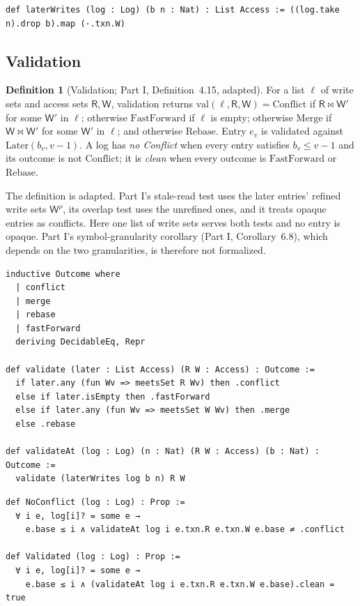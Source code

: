 \documentclass[11pt,letterpaper]{article}
\theoremstyle{definition}
\newtheorem{definition}[theorem]{Definition}
\theoremstyle{remark}
\newcommand{\R}{\mathsf{R}}
\newcommand{\W}{\mathsf{W}}
\newcommand{\meets}{\bowtie}
\newcommand{\Later}{\mathrm{Later}}
\newcommand{\op}[1]{\mathrm{#1}}
\newcommand{\val}{\op{val}}
\newcommand{\FF}{\mathrm{FastForward}}
\newcommand{\Rb}{\mathrm{Rebase}}
\newcommand{\Mg}{\mathrm{Merge}}
\newcommand{\Cf}{\mathrm{Conflict}}
\begin{document}
\begin{lstlisting}[language=Lean,caption={Later write sets (\texttt{YonedaTx/Log.lean})},label={lst:mcbl:later}]
def laterWrites (log : Log) (b n : Nat) : List Access := ((log.take n).drop b).map (·.txn.W)
\end{lstlisting}

\subsection{Validation}

\begin{definition}[Validation; Part I, Definition~4.15, adapted]
\label{def:mcbl:validation}
For a list $\ell$ of write sets and access sets $\R,\W$, validation returns $\val(\ell,\R,\W)=\Cf$ if $\R\meets\W'$ for some $\W'$ in $\ell$; otherwise $\FF$ if $\ell$ is empty; otherwise $\Mg$ if $\W\meets\W'$ for some $\W'$ in $\ell$; and otherwise $\Rb$. Entry $e_v$ is validated against $\Later(b_v,v-1)$. A log has \emph{no Conflict} when every entry satisfies $b_v\leq v-1$ and its outcome is not $\Cf$; it is \emph{clean} when every outcome is $\FF$ or $\Rb$.
\end{definition}

The definition is adapted. Part I's stale-read test uses the later entries' refined write sets $\W^\rho$, its overlap test uses the unrefined ones, and it treats opaque entries as conflicts. Here one list of write sets serves both tests and no entry is opaque. Part I's symbol-granularity corollary (Part I, Corollary~6.8), which depends on the two granularities, is therefore not formalized.

\begin{lstlisting}[language=Lean,caption={Validation outcomes (\texttt{YonedaTx/Validation.lean})},label={lst:mcbl:validate}]
inductive Outcome where
  | conflict
  | merge
  | rebase
  | fastForward
  deriving DecidableEq, Repr

def validate (later : List Access) (R W : Access) : Outcome :=
  if later.any (fun Wv => meetsSet R Wv) then .conflict
  else if later.isEmpty then .fastForward
  else if later.any (fun Wv => meetsSet W Wv) then .merge
  else .rebase

def validateAt (log : Log) (n : Nat) (R W : Access) (b : Nat) : Outcome :=
  validate (laterWrites log b n) R W
\end{lstlisting}

\begin{lstlisting}[language=Lean,caption={Validated logs (\texttt{YonedaTx/Validation.lean})},label={lst:mcbl:validated}]
def NoConflict (log : Log) : Prop :=
  ∀ i e, log[i]? = some e →
    e.base ≤ i ∧ validateAt log i e.txn.R e.txn.W e.base ≠ .conflict

def Validated (log : Log) : Prop :=
  ∀ i e, log[i]? = some e →
    e.base ≤ i ∧ (validateAt log i e.txn.R e.txn.W e.base).clean = true
\end{lstlisting}
\end{document}
